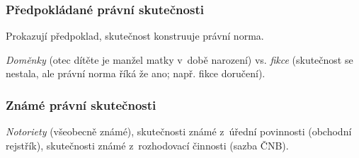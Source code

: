 \subsubsection{Předpokládané právní skutečnosti}

Prokazují předpoklad, skutečnost konstruuje právní norma.

\emph{Doměnky} (otec dítěte je manžel matky v~době narození) vs. \emph{fikce} (skutečnost se nestala, ale právní norma říká že ano; např. fikce doručení).


\subsubsection{Známé právní skutečnosti}

\emph{Notoriety} (všeobecně známé), skutečnosti známé z~úřední povinnosti (obchodní rejstřík), skutečnosti známé z~rozhodovací činnosti (sazba ČNB).
